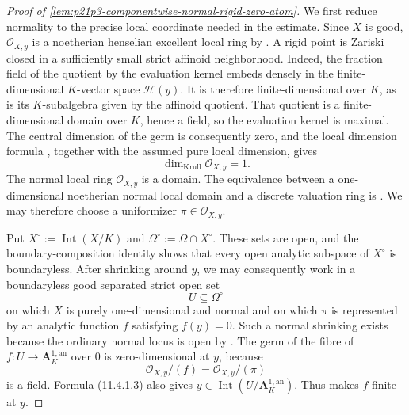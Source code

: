 
\begin{proof}[Proof of
\cref{lem:p21p3-componentwise-normal-rigid-zero-atom}]
We first reduce normality to the precise local coordinate needed in the
estimate.  Since $X$ is good, $\mathcal O_{X,y}$ is a noetherian henselian
excellent local ring by \cite[\S11.1.10]{CLD25}.  A rigid point is Zariski
closed in a sufficiently small strict affinoid neighborhood.  Indeed, the
fraction field of the quotient by the evaluation kernel embeds densely in
the finite-dimensional $K$-vector space $\mathscr H(y)$.  It is therefore
finite-dimensional over $K$, as is its $K$-subalgebra given by the affinoid
quotient.  That quotient is a finite-dimensional domain over $K$, hence a
field, so the evaluation kernel is maximal.  The central dimension of the
germ is consequently zero, and the local dimension formula
\cite[(11.5.5.1)]{CLD25}, together with the assumed pure local dimension,
gives
\[
                  \dim_{\mathrm{Krull}}\mathcal O_{X,y}=1.
\]
The normal local ring $\mathcal O_{X,y}$ is a domain.  The equivalence
between a one-dimensional noetherian normal local domain and a discrete
valuation ring is
\cite[\href{https://stacks.math.columbia.edu/tag/00PD}{Tag~00PD}]
{stacks-project}.  We may therefore choose a uniformizer
$\pi\in\mathcal O_{X,y}$.

Put $X^\circ:=\operatorname{Int}(X/K)$ and
$\Omega^\circ:=\Omega\cap X^\circ$.  These sets are open, and the
boundary-composition identity \cite[(11.4.1.3)]{CLD25} shows that every open
analytic subspace of $X^\circ$ is boundaryless.  After shrinking around
$y$, we may consequently work in a boundaryless good separated strict open
set
\[
                         U\subseteq\Omega^\circ
\]
on which $X$ is purely one-dimensional and normal and on which $\pi$ is
represented by an analytic function $f$ satisfying $f(y)=0$.  Such a normal
shrinking exists because the ordinary normal locus is open by
\cite[\S11.3.1]{CLD25}.  The germ of the fibre of
$f:U\to\mathbf A_K^{1,\mathrm{an}}$ over $0$ is zero-dimensional at $y$,
because
\[
                  \mathcal O_{X,y}/(f)
                  =\mathcal O_{X,y}/(\pi)
\]
is a field.  Formula (11.4.1.3) also gives
$y\in\operatorname{Int}(U/\mathbf A_K^{1,\mathrm{an}})$.  Thus
\cite[Lemma~11.6.5(a)]{CLD25} makes $f$ finite at $y$.


\end{proof}
